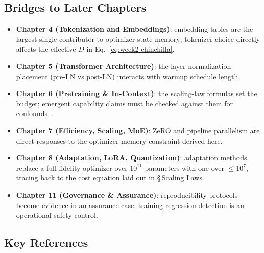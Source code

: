 \subsection{Bridges to Later Chapters}

\begin{itemize}
  \item \textbf{Chapter 4 (Tokenization and Embeddings)}: embedding tables
        are the largest single contributor to optimizer state memory;
        tokenizer choice directly affects the effective $D$ in
        Eq.~\eqref{eq:week2-chinchilla}.
  \item \textbf{Chapter 5 (Transformer Architecture)}: the layer
        normalization placement (pre-LN vs post-LN)
        \citep{xiong2020onlayer} interacts with warmup schedule length.
  \item \textbf{Chapter 6 (Pretraining \& In-Context)}: the scaling-law
        formulas set the budget; emergent capability claims must be
        checked against them for confounds~\citep{schaeffer2023mirage}.
  \item \textbf{Chapter 7 (Efficiency, Scaling, MoE)}: ZeRO
        \citep{rajbhandari2020zero} and pipeline parallelism
        \citep{narayanan2021efficient} are direct responses to the
        optimizer-memory constraint derived here.
  \item \textbf{Chapter 8 (Adaptation, LoRA, Quantization)}: adaptation
        methods replace a full-fidelity optimizer over $10^{11}$
        parameters with one over $\le 10^{7}$, tracing back to the
        cost equation laid out in \S\,Scaling Laws.
  \item \textbf{Chapter 11 (Governance \& Assurance)}: reproducibility
        protocols become evidence in an assurance case; training
        regression detection is an operational-safety control.
\end{itemize}

\subsection{Key References}

